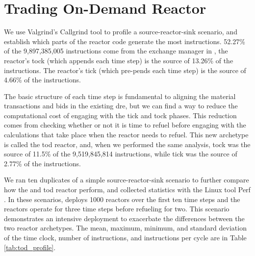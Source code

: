 \section{Trading On-Demand Reactor}
\label{sec:trading_reactor}



We use Valgrind's \cite{valgrind} Callgrind \cite{callgrind} tool to profile a source-reactor-sink scenario, and establish which parts of the \cycamore reactor code generate the most instructions. 52.27\% of the 9,897,385,005 instructions come from the exchange manager in \cyclus, the reactor's tock (which appends each time step) is the source of 13.26\% of the instructions. The reactor's tick (which pre-pends each time step) is the source of 4.66\% of the instructions.

The basic structure of each time step is fundamental to aligning the material transactions and bids in the existing \gls{dre}, but we can find a way to reduce the computational cost of engaging with the tick and tock phases. This reduction comes from checking whether or not it is time to refuel before engaging with the calculations that take place when the reactor needs to refuel.
This new archetype is called the \gls{tod} reactor, and, when we performed the same analysis, tock was the source of 11.5\% of the 9,519,845,814 instructions, while tick was the source of 2.77\% of the instructions.



We ran ten duplicates of a simple source-reactor-sink scenario to further compare how the \cycamore and \gls{tod} reactor perform, and collected statistics with the Linux tool Perf \cite{perf}. In these scenarios, \cyclus deploys 1000 reactors over the first ten time steps and the reactors operate for three time steps before refueling for two. This scenario demonstrates an intensive deployment to exacerbate the differences between the two reactor archetypes. The mean, maximum, minimum, and standard deviation of the time clock, number of instructions, and instructions per cycle are in Table \ref{tab:tod_profile}.

